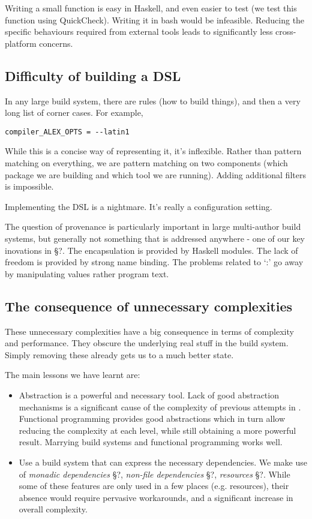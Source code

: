 Writing a small function is easy in Haskell, and even easier to test (we test this function using QuickCheck). Writing it in bash would be infeasible. Reducing the specific behaviours required from external tools leads to significantly less cross-platform concerns.

\subsection{Difficulty of building a DSL}

In any large build system, there are rules (how to build things), and then a very long list of corner cases. For example,

\begin{lstlisting}
compiler_ALEX_OPTS = --latin1
\end{lstlisting}

While this is a concise way of representing it, it's inflexible. Rather than pattern matching on everything, we are pattern matching on two components (which package we are building and which tool we are running). Adding additional filters is impossible.

Implementing the DSL is a nightmare. It's really a configuration setting.


The question of provenance is particularly important in large multi-author build systems, but generally not something that is addressed anywhere - one of our key inovations in \S?. The encapsulation is provided by Haskell modules. The lack of freedom is provided by strong name binding. The problems related to `:' go away by manipulating values rather program text.


\subsection{The consequence of unnecessary complexities}

These unnecessary complexities have a big consequence in terms of complexity and performance. They obscure the underlying real stuff in the build system. Simply removing these already gets us to a much better state.

The main lessons we have learnt are:

\begin{itemize}
\item Abstraction is a powerful and necessary tool. Lack of good abstraction mechanisms is a significant cause of the complexity of previous attempts in \make{}. Functional programming provides good abstractions which in turn allow reducing the complexity at each level, while still obtaining a more powerful result. Marrying build systems and functional programming works well.
\item Use a build system that can express the necessary dependencies. We make use of \textit{monadic dependencies} \S?, \textit{non-file dependencies} \S?, \textit{resources} \S?. While some of these features are only used in a few places (e.g. resources), their absence would require pervasive workarounds, and a significant increase in overall complexity.
\end{itemize}

